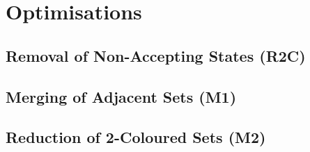 







\section{Optimisations}
\label{3_optimisations}
\subsection{Removal of Non-Accepting States (R2C)}
\subsection{Merging of Adjacent Sets (M1)}
\subsection{Reduction of 2-Coloured Sets (M2)}
